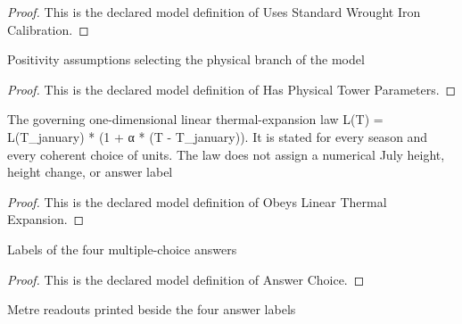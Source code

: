 \begin{proof}
  This is the declared model definition of Uses Standard Wrought Iron Calibration.
\end{proof}
\begin{definition}
  \label{def:physics:phyx-mini-0483:phyxminiproblems-problemphyxmini0483-hasphysicaltowerparameters}
  Positivity assumptions selecting the physical branch of the model
\end{definition}
\begin{proof}
  This is the declared model definition of Has Physical Tower Parameters.
\end{proof}
\begin{definition}
  \label{def:physics:phyx-mini-0483:phyxminiproblems-problemphyxmini0483-obeyslinearthermalexpansion}
  The governing one-dimensional linear thermal-expansion law L(T) = L(T\_january) * (1 + α * (T - T\_january)). It is stated for every season and every coherent choice of units. The law does not assign a numerical July height, height change, or answer label
\end{definition}
\begin{proof}
  This is the declared model definition of Obeys Linear Thermal Expansion.
\end{proof}
\begin{definition}
  \label{def:physics:phyx-mini-0483:phyxminiproblems-problemphyxmini0483-answerchoice}
  Labels of the four multiple-choice answers
\end{definition}
\begin{proof}
  This is the declared model definition of Answer Choice.
\end{proof}
\begin{definition}
  \label{def:physics:phyx-mini-0483:phyxminiproblems-problemphyxmini0483-displayedheightchangemeters}
  Metre readouts printed beside the four answer labels
\end{definition}
